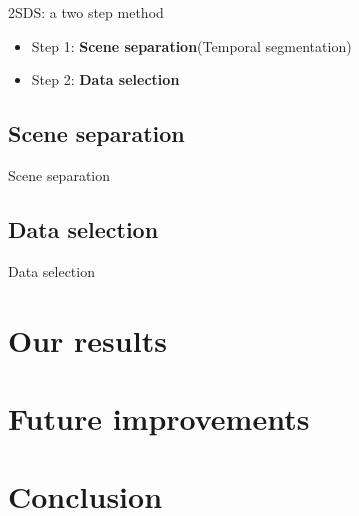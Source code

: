 \documentclass[aspectratio=43,display]{beamer}
\begin{document}
			\begin{frame}{2SDS: a two step method}

				\begin{itemize}
					\item Step 1: \textbf{Scene separation}(Temporal segmentation)
					\item Step 2: \textbf{Data selection}
				\end{itemize}

			\end{frame}

		\subsection{Scene separation}

			\begin{frame}{Scene separation}
			\end{frame}

		\subsection{Data selection}

			\begin{frame}{Data selection}
			\end{frame}

	\section{Our results}

	\section{Future improvements}

	\section{Conclusion}
\end{document}
